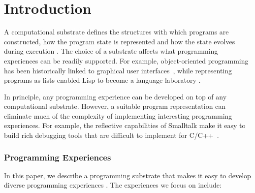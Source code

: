 \documentclass[sigconf,anonymous,screen]{acmart}
\begin{document}

\section{Introduction}

A computational substrate defines the structures with which programs are constructed, how
the program state is represented and how the state evolves during execution \cite{jakubovic-2022-ladder}.
The choice of a substrate affects what programming experiences can be readily supported.
For example, object-oriented programming has been historically linked to graphical user
interfaces~\cite{kay-1993-smalltalk}, while representing programs as lists enabled Lisp to become
a language laboratory \cite{steele-1993-lisp}.

In principle, any programming experience can be developed on top of any computational
substrate. However, a suitable program representation can eliminate much of the complexity of implementing interesting
programming experiences. For example, the reflective capabilities of Smalltalk make it easy
to build rich debugging tools \cite{rauch-2019-babylonian} that are difficult to implement
for C/C++~\cite{kell-2018-unix,kell-2024-debugging}.

\subsubsection*{Programming Experiences}

In this paper, we describe a programming substrate that makes it easy to develop diverse
programming experiences \cite{myers-2006-eup}. The experiences we focus on include:
\end{document}
